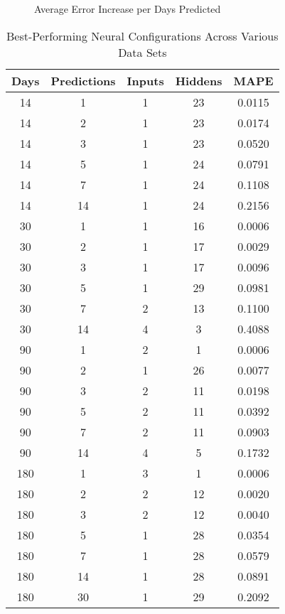 \documentclass[a4paper,12pt]{article}
\begin{document}
	\begin{figure}[!htbp]
		\centering
		\caption{Average Error Increase per Days Predicted}
		\label{prediction_slope}
	\end{figure}
	
	\begin{table}[]
		\centering
		\begin{tabular}{@{}cc|cc|c@{}}
			\toprule
			\textbf{Days} & \textbf{Predictions} & \textbf{Inputs} & \textbf{Hiddens} & \textbf{MAPE} \\ \midrule
			14 & 1 & 1 & 23 & 0.0115 \\
			14 & 2 & 1 & 23 & 0.0174 \\
			14 & 3 & 1 & 23 & 0.0520 \\
			14 & 5 & 1 & 24 & 0.0791 \\
			14 & 7 & 1 & 24 & 0.1108 \\
			14 & 14 & 1 & 24 & 0.2156 \\ \midrule
			30 & 1 & 1 & 16 & 0.0006 \\
			30 & 2 & 1 & 17 & 0.0029 \\
			30 & 3 & 1 & 17 & 0.0096 \\
			30 & 5 & 1 & 29 & 0.0981 \\
			30 & 7 & 2 & 13 & 0.1100 \\
			30 & 14 & 4 & 3 & 0.4088 \\ \midrule
			90 & 1 & 2 & 1 & 0.0006 \\
			90 & 2 & 1 & 26 & 0.0077 \\
			90 & 3 & 2 & 11 & 0.0198 \\
			90 & 5 & 2 & 11 & 0.0392 \\
			90 & 7 & 2 & 11 & 0.0903 \\
			90 & 14 & 4 & 5 & 0.1732 \\ \midrule
			180 & 1 & 3 & 1 & 0.0006 \\
			180 & 2 & 2 & 12 & 0.0020 \\
			180 & 3 & 2 & 12 & 0.0040 \\
			180 & 5 & 1 & 28 & 0.0354 \\
			180 & 7 & 1 & 28 & 0.0579 \\
			180 & 14 & 1 & 28 & 0.0891 \\
			180 & 30 & 1 & 29 & 0.2092 \\ \bottomrule
		\end{tabular}
		\caption{Best-Performing Neural Configurations Across Various Data Sets}
		\label{predslope}
	\end{table}
	
\end{document}
